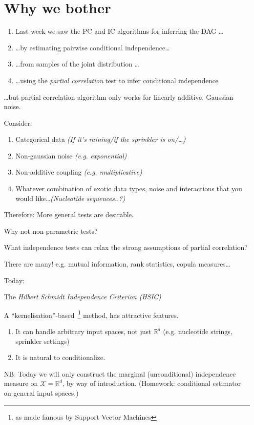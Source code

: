 \clearpage

\section{Why we bother}

\begin{enumerate}
	\item Last week we saw the PC and IC algorithms for inferring the DAG \ldots 
	\item \ldots by estimating pairwise conditional independence\ldots
	\item \ldots from samples of the joint distribution \ldots
	\item \ldots using the \emph{partial correlation} test to infer conditional independence
\end{enumerate}
\clearpage
\dots but partial correlation algorithm only works for linearly additive, Gaussian noise.
\clearpage

Consider:
\begin{enumerate}
\item Categorical data \emph{(If it's raining/if the sprinkler is on/\ldots)}
\item Non-gaussian noise \emph{(e.g. exponential)}
\item Non-additive coupling \emph{(e.g. multiplicative)}
\item Whatever combination of exotic data types, noise and interactions that you would like\dots \emph{(Nucleotide sequences..?)}
\end{enumerate}
\clearpage

Therefore: More general tests are desirable.

Why not non-parametric tests?

\clearpage

What independence tests can relax the strong assumptions of partial correlation?

There are many! e.g. mutual information, rank statistics, copula measures\ldots

\clearpage
Today:

The \emph{Hilbert Schmidt Independence Criterion (HSIC)}

A ``kernelisation''-based~\footnote{as made famous by Support Vector Machines} method, has attractive features.
\begin{enumerate}
\item It can handle arbitrary input spaces, not just $\mathbb{R}^d$ (e.g. nucleotide strings, sprinkler settings)
\item It is natural to conditionalize.
\end{enumerate}
\clearpage
NB: Today we will only construct the marginal (unconditional) independence measure on $\mathcal{X}=\mathbb{R}^d$, by way of introduction. (Homework: conditional estimator on general input spaces.)
\clearpage

